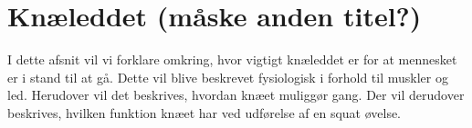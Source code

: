 \section{Knæleddet (måske anden titel?)}
I dette afsnit vil vi forklare omkring, hvor vigtigt knæleddet er for at mennesket er i stand til at gå. Dette vil blive beskrevet fysiologisk i forhold til muskler og led. Herudover vil det beskrives, hvordan knæet muliggør gang. Der vil derudover beskrives, hvilken funktion knæet har ved udførelse af en squat øvelse.
